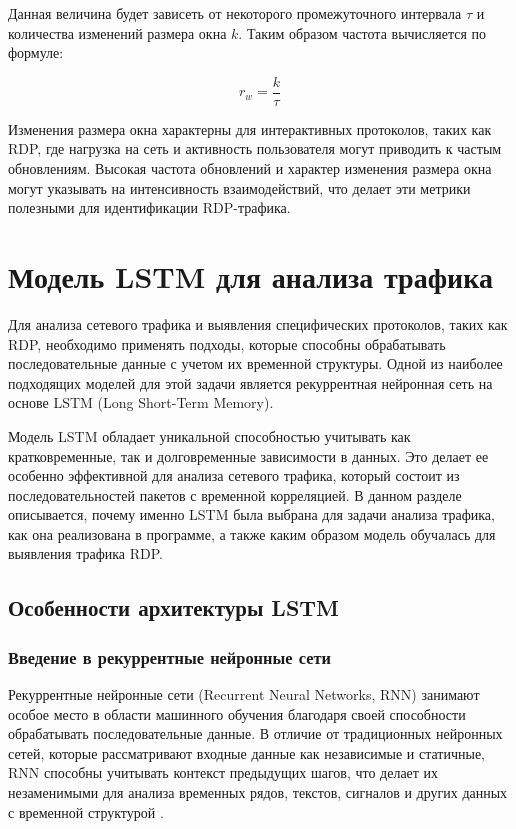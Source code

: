 \documentclass[bachelor, och, coursework]{SCWorks}
\begin{document}
Данная величина будет зависеть от некоторого промежуточного интервала $\tau$ и количества изменений размера окна $k$. Таким образом частота вычисляется по формуле:

\begin{equation}
  r_w = \frac{k}{\tau}
\end{equation}

Изменения размера окна характерны для интерактивных протоколов, таких как RDP, где нагрузка на сеть и активность пользователя могут приводить к частым 
обновлениям. Высокая частота обновлений и характер изменения размера окна могут указывать на интенсивность взаимодействий, что делает эти метрики 
полезными для идентификации RDP-трафика.

\section{Модель LSTM для анализа трафика}

Для анализа сетевого трафика и выявления специфических протоколов, таких как RDP, необходимо применять подходы, которые способны обрабатывать 
последовательные данные с учетом их временной структуры. Одной из наиболее подходящих моделей для этой задачи является рекуррентная нейронная 
сеть на основе LSTM (Long Short-Term Memory).

Модель LSTM обладает уникальной способностью учитывать как кратковременные, так и долговременные зависимости в данных. Это делает ее особенно 
эффективной для анализа сетевого трафика, который состоит из последовательностей пакетов с временной корреляцией. В данном разделе описывается, 
почему именно LSTM была выбрана для задачи анализа трафика, как она реализована в программе, а также каким образом модель обучалась для выявления 
трафика RDP.




\subsection{Особенности архитектуры LSTM}
  \subsubsection{Введение в рекуррентные нейронные сети}
  Рекуррентные нейронные сети (Recurrent Neural Networks, RNN) занимают особое место в области машинного обучения 
  благодаря своей способности обрабатывать последовательные данные. В отличие от традиционных нейронных сетей, которые 
  рассматривают входные данные как независимые и статичные, RNN способны учитывать контекст предыдущих шагов, что делает их незаменимыми 
  для анализа временных рядов, текстов, сигналов и других данных с временной структурой \cite{nn}.  
\end{document}

